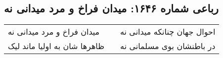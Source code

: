 \begin{center}
\section*{رباعی شماره ۱۶۴۶: میدان فراخ و مرد میدانی نه}
\label{sec:1646}
\begin{longtable}{l p{0.5cm} r}
میدان فراخ و مرد میدانی نه
&&
احوال جهان چنانکه میدانی نه
\\
ظاهرها شان به اولیا ماند لیک
&&
در باطنشان بوی مسلمانی نه
\\
\end{longtable}
\end{center}
